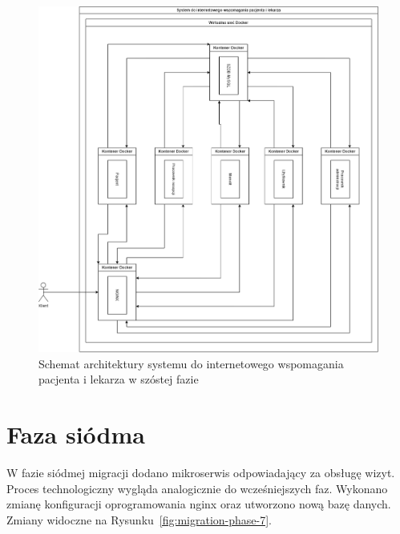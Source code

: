 \documentclass[12pt,twoside]{book}
\newcommand{\captionvspace}{\vspace{6pt}}
\begin{document}
\begin{figure}[ht]
\centering
\includegraphics[width=\textwidth]{includes/images/migration-phase-6.png}
\captionvspace
\caption{Schemat architektury systemu do internetowego wspomagania pacjenta i lekarza w szóstej fazie}
\label{fig:migration-phase-6}
\end{figure}

\section{Faza siódma}
W fazie siódmej migracji dodano mikroserwis odpowiadający za obsługę wizyt. Proces technologiczny wygląda analogicznie do wcześniejszych faz. Wykonano zmianę konfiguracji oprogramowania nginx oraz utworzono nową bazę danych. Zmiany widoczne na Rysunku~\ref{fig:migration-phase-7}.
\end{document}
